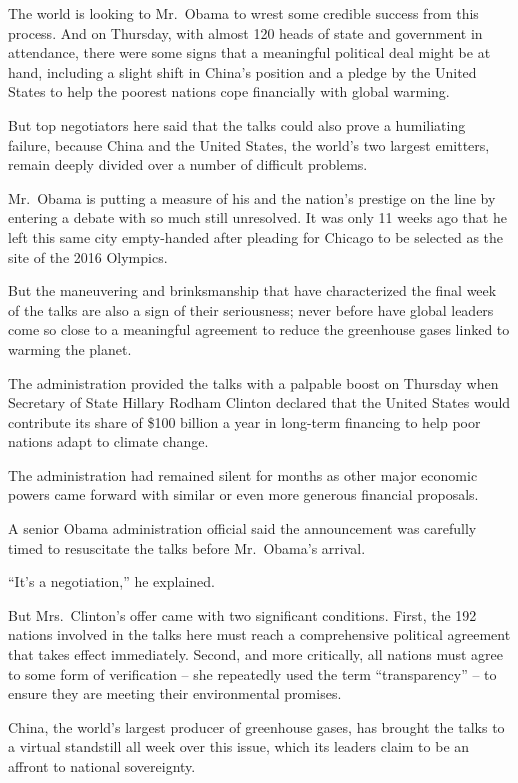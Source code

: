 ﻿\documentclass[12pt]{article}
\begin{document}
The world is looking to Mr.~Obama to wrest some credible success from this process. And on Thursday,
with almost 120 heads of state and government in attendance, there were some signs that a meaningful
political deal might be at hand, including a slight shift in China's position and a pledge by the
United States to help the poorest nations cope financially with global warming.

But top negotiators here said that the talks could also prove a humiliating failure, because China
and the United States, the world's two largest emitters, remain deeply divided over a number of
difficult problems.

Mr.~Obama is putting a measure of his and the nation's prestige on the line by entering a debate
with so much still unresolved. It was only 11 weeks ago that he left this same city empty-handed
after pleading for Chicago to be selected as the site of the 2016 Olympics.

But the maneuvering and brinksmanship that have characterized the final week of the talks are also a
sign of their seriousness; never before have global leaders come so close to a meaningful agreement
to reduce the greenhouse gases linked to warming the planet.

The administration provided the talks with a palpable boost on Thursday when Secretary of State
Hillary Rodham Clinton declared that the United States would contribute its share of \$100 billion a
year in long-term financing to help poor nations adapt to climate change.

The administration had remained silent for months as other major economic powers came forward with
similar or even more generous financial proposals.

A senior Obama administration official said the announcement was carefully timed to resuscitate the
talks before Mr.~Obama's arrival.

``It's a negotiation,'' he explained.

But Mrs.~Clinton's offer came with two significant conditions. First, the 192 nations involved in
the talks here must reach a comprehensive political agreement that takes effect immediately. Second,
and more critically, all nations must agree to some form of verification -- she repeatedly used the
term ``transparency'' -- to ensure they are meeting their environmental promises.

China, the world's largest producer of greenhouse gases, has brought the talks to a virtual
standstill all week over this issue, which its leaders claim to be an affront to national
sovereignty.
\end{document}
